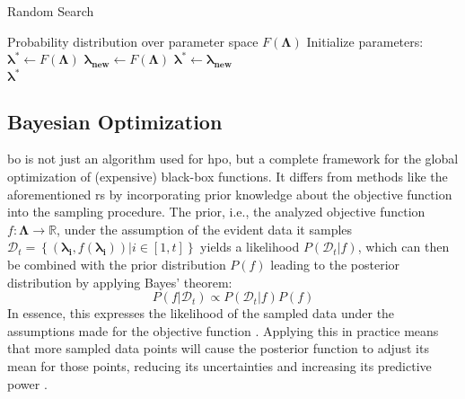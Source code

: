 \begin{algorithm}
	\caption{Random Search}
	\label{alg:randomsearch}
	\begin{algorithmic}
		\Require Probability distribution over parameter space $F(\mathbf{\Lambda})$
		\State Initialize parameters: $\mathbf{\lambda^*} \gets F(\mathbf{\Lambda})$
		\Repeat
		\State $\mathbf{\lambda_{\text{new}}} \gets F(\mathbf{\Lambda})$
		\State $\mathbf{\lambda^*} \gets \mathbf{\lambda_{\text{new}}}$
		\EndIf
		\\
		\Return $\mathbf{\lambda^*}$
	\end{algorithmic}
\end{algorithm}


\subsection{Bayesian Optimization}
\label{chap:bo}
\gls{bo} is not just an algorithm used for \gls{hpo}, but a complete framework for the global optimization of (expensive) black-box functions. It differs from methods like the aforementioned \gls{rs} by incorporating prior knowledge about the objective function into the sampling procedure. 
The prior, i.e., the analyzed objective function $f: \mathcal{\mathbf{\Lambda}} \to \mathbb{R}$, under the assumption of the evident data it samples $\mathcal{D}_t = \left\lbrace (\mathbf{\lambda_i}, f(\mathbf{\lambda_i})) |  i\in [1,t] \right\rbrace $ yields a likelihood $P(\mathcal{D}_t|f)$, which can then be combined with the prior distribution $P(f)$ leading to the posterior distribution by applying Bayes' theorem:
\begin{equation}
	P(f|\mathcal{D}_t) \propto P(\mathcal{D}_t|f) P(f)
\end{equation}
In essence, this expresses the likelihood of the sampled data under the assumptions made for the objective function \cite{brochu2010tutorial}. 
Applying this in practice means that more sampled data points will cause the posterior function to adjust its mean for those points, reducing its uncertainties and increasing its predictive power \cite{williams2006gaussian}. 

